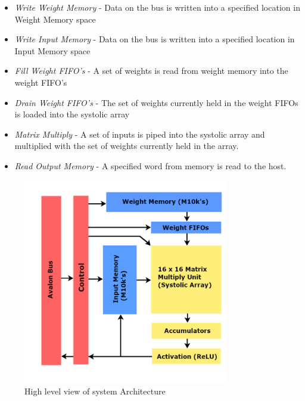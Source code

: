 \documentclass[11pt, conference, onecolumn]{IEEEtran}
\begin{document}
        \begin{center}
        \begin{itemize}

            \item{\textit{Write Weight Memory} - Data on the bus is written into a
            specified location in Weight Memory space}

            \item{\textit{Write Input Memory} - Data on the bus is written into a
            specified location in Input Memory space}

            \item{\textit{Fill Weight FIFO's} - A set of weights is read from weight
            memory into the weight FIFO's}

            \item{\textit{Drain Weight FIFO's} - The set of weights currently held in
            the weight FIFOs is loaded into the systolic array}

            \item{\textit{Matrix Multiply} - A set of inputs is piped into the systolic
            array and multiplied with the set of weights currently held in the array.}

            \item{\textit{Read Output Memory} - A specified word from memory is read to
            the host.}
        \end{itemize}
        \end{center}

        \newpage

        \begin{figure}[htbp]
            \centering
            \includegraphics[width=9cm]{../figures/sysArchitecture.png}
            \caption{High level view of system Architecture}
        \end{figure}
\end{document}
